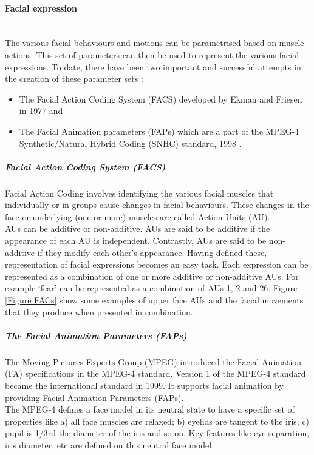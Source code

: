 \documentclass[11pt]{article}
\begin{document}
\paragraph{Facial expression}\mbox{}\\
The various facial behaviours and motions can be parametrised based on muscle actions. This set of parameters can then be used to represent the various facial expressions. To date, there have been two important and successful attempts in the creation of these parameter sets \citep{Bettadapura12}:
\begin{itemize}
\item The Facial Action Coding System (FACS) developed by Ekman and Friesen in 1977 \citep{Ekman77} and
\item The Facial Animation parameters (FAPs) which are a part of the MPEG-4 Synthetic/Natural Hybrid Coding (SNHC) standard, 1998 \citep{Pandzic03}.
\end{itemize}
\subparagraph{Facial Action Coding System (FACS)}
Facial Action Coding involves identifying the various facial muscles that individually or in groups cause changes in facial behaviours. These changes in the face or underlying (one or more) muscles are called Action Units (AU). \\

AUs can be additive or non-additive. AUs are said to be additive if the appearance of each AU is independent. Contrastly, AUs are said to be non-additive if they modify each other’s appearance. Having defined these, representation of facial expressions becomes an easy task. Each expression can be represented as a combination of one or more additive or non-additive AUs. For example ‘fear’ can be represented as a combination of AUs 1, 2 and 26. Figure \ref{Figure FACs} show some examples of upper face AUs and the facial movements that they produce when presented in combination.
\subparagraph{The Facial Animation Parameters (FAPs)}
The Moving Pictures Experts Group (MPEG) introduced the Facial Animation (FA) specifications in the MPEG-4 standard. Version 1 of the MPEG-4 standard became the international standard in 1999. It supports facial animation by providing Facial Animation Parameters (FAPs).\\

The MPEG-4 defines a face model in its neutral state to have a specific set of properties like a) all face muscles are relaxed; b) eyelids are tangent to the iris; c) pupil is 1/3rd the diameter of the iris and so on. Key features like eye separation, iris diameter, etc are defined on this neutral face model.\\
\end{document}
